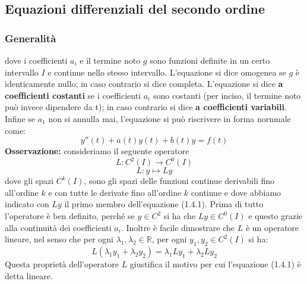 \documentclass[a4paper]{article}
\numberwithin{equation}{subsection}
\begin{document}
\subsection{Equazioni differenziali del secondo ordine}

\subsubsection{Generalità}

\noindent
dove i coefficienti $a_i$ e il termine noto $g$ sono funzioni definite in un certo intervallo $I$ 
e continue nello stesso intervallo. L'equazione si dice omogenea se $g$ è identicamente nullo; in caso 
contrario si dice completa.
L'equazione si dice \textbf{a coefficienti costanti} se i coefficienti $a_i$ sono costanti (per inciso, il termine noto può invece dipendere da t); in caso
contrario si dice \textbf{a coefficienti variabili}. Infine se $a_1$ non si annulla mai, l'equazione si può riscrivere in forma nornmale come:
\begin{equation}
    y''(t) + a(t)y(t) + b(t)y = f(t)
\end{equation}
\textbf{Osservazione:} consideriamo il seguente operatore
\[L: C^2(I) \rightarrow C^0(I)\]
\[L: y \mapsto Ly\]
dove gli spazi $C^k(I)$, sono gli spazi delle funzioni continue derivabili fino all'ordine $k$ e con tutte
le derivate fino all'ordine $k$ continue e dove abbiamo indicato con $Ly$ il primo membro dell'equazione (1.4.1).
Prima di tutto l'operatore è ben definito, perché se $y \in C^2$ si ha che $Ly \in C^0(I)$ e questo grazie alla continuità 
dei coefficienti $a_i$. Inoltre è facile dimostrare che $L$ è un operatore lineare, nel senso che per ogni $\lambda_1, \lambda_2 \in \mathbb{R}$, per ogni $y_1, y_2 \in C^2(I)$ si ha:
\[L(\lambda_1y_1 + \lambda_2y_2) = \lambda_1Ly_1 + \lambda_2Ly_2\]
Questa proprietà dell'operatore $L$ giustifica il motivo per cui l'equazione (1.4.1) è detta lineare.
\end{document}
